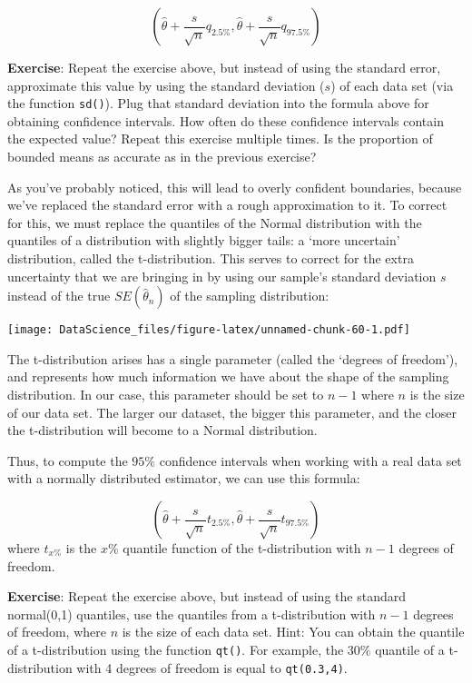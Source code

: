 \documentclass[
]{book}
\begin{document}
\[(\hat{\theta} + \frac{s}{\sqrt{n}}q_{2.5\%}, \hat{\theta} + \frac{s}{\sqrt{n}}q_{97.5\%})\]

\textbf{Exercise}: Repeat the exercise above, but instead of using the standard error, approximate this value by using the standard deviation (\(s\)) of each data set (via the function \texttt{sd()}). Plug that standard deviation into the formula above for obtaining confidence intervals. How often do these confidence intervals contain the expected value? Repeat this exercise multiple times. Is the proportion of bounded means as accurate as in the previous exercise?

As you've probably noticed, this will lead to overly confident boundaries, because we've replaced the standard error with a rough approximation to it. To correct for this, we must replace the quantiles of the Normal distribution with the quantiles of a distribution with slightly bigger tails: a `more uncertain' distribution, called the t-distribution. This serves to correct for the extra uncertainty that we are bringing in by using our sample's standard deviation \(s\) instead of the true \(SE(\hat{\theta}_n)\) of the sampling distribution:

\texttt{[image: DataScience\_files/figure-latex/unnamed-chunk-60-1.pdf]}

The t-distribution arises has a single parameter (called the `degrees of freedom'), and represents how much information we have about the shape of the sampling distribution. In our case, this parameter should be set to \(n-1\) where \(n\) is the size of our data set. The larger our dataset, the bigger this parameter, and the closer the t-distribution will become to a Normal distribution.

Thus, to compute the \(95\%\) confidence intervals when working with a real data set with a normally distributed estimator, we can use this formula:

\[(\hat{\theta} + \frac{s}{\sqrt{n}}t_{2.5\%}, \hat{\theta} + \frac{s}{\sqrt{n}}t_{97.5\%})\]
where \(t_{x\%}\) is the \(x\%\) quantile function of the t-distribution with \(n-1\) degrees of freedom.

\textbf{Exercise}: Repeat the exercise above, but instead of using the standard normal(0,1) quantiles, use the quantiles from a t-distribution with \(n-1\) degrees of freedom, where \(n\) is the size of each data set. Hint: You can obtain the quantile of a t-distribution using the function \texttt{qt()}. For example, the \(30\%\) quantile of a t-distribution with 4 degrees of freedom is equal to \texttt{qt(0.3,4)}.
\end{document}
